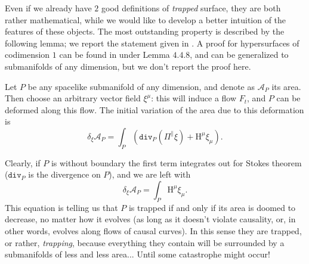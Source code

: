 Even if we already have \(2\) good definitions of \emph{trapped} surface, they are both rather mathematical, while we would like to develop a better intuition of the features of these objects. The most outstanding property is described by the following lemma; we report the statement given in \cite{senovilla2022critical}. A proof for hypersurfaces of codimension \(1\) can be found in \cite{kriele1999spacetime} under Lemma \(4.4.8\), and can be generalized to submanifolds of any dimension, but we don't report the proof here.
\begin{lemma}
	\label{lemma:variation-area}
	Let \(P\) be any spacelike submanifold of any dimension, and denote as \(\mathcal{A}_P\) its area. Then choose an arbitrary vector field \(\xi^{\mu}\): this will induce a flow \(F_t\), and \(P\) can be deformed along this flow. The initial variation of the area due to this deformation is
	\[
	\delta_{\xi}\mathcal{A}_P = \int_{P} \left(\texttt{div}_P (\Pi^{\parallel}\xi) + \mathrm{H}^{\mu}\xi_{\mu}\right).
	\]
\end{lemma}
 Clearly, if \(P\) is without boundary the first term integrates out for Stokes theorem (\(\texttt{div}_P\) is the divergence on \(P\)), and we are left with
 \begin{equation}
 	\label{eq:variation-area}
 	\delta_{\xi}\mathcal{A}_P = \int_{P} \mathrm{H}^{\mu}\xi_{\mu}.
 \end{equation}
	This equation is telling us that \(P\) is trapped if and only if its area is doomed to decrease, no matter how it evolves (as long as it doesn't violate causality, or, in other words, evolves along flows of causal curves). In this sense they are trapped, or rather, \emph{trapping}, because everything they contain will be surrounded by a submanifolds of less and less area... Until some catastrophe might occur!

